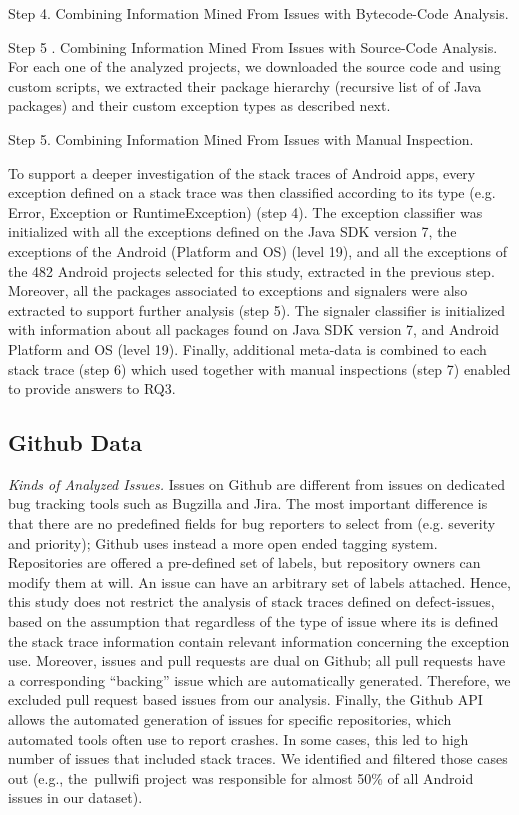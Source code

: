 \documentclass[conference]{IEEEtran}
\begin{document}
Step 4. Combining Information Mined From Issues with Bytecode-Code Analysis. 


Step 5
. Combining Information Mined From Issues with Source-Code Analysis.
For each one of the analyzed projects, we
downloaded the source code and using custom scripts, we extracted their package
hierarchy (recursive list of of Java packages) and their custom exception types
as described next.




Step 5. Combining Information Mined From Issues with Manual Inspection.

To support a deeper investigation of the stack traces of Android apps, every
exception defined on a stack trace was then classified according to its type
(e.g. Error, Exception or RuntimeException) (step 4). The exception classifier
was initialized with all the exceptions defined on the Java SDK version 7, the
exceptions of the Android (Platform and OS) (level 19), and all the exceptions
of the 482 Android projects selected for this study, extracted in the previous
step. Moreover, all the packages associated to exceptions and signalers were
also extracted to support further analysis (step 5). The signaler classifier is
initialized with information about all packages found on Java SDK version 7, and
Android Platform and OS (level 19). Finally, additional meta-data is combined to
each stack trace (step 6) which used together with manual inspections (step 7)
enabled to provide answers to RQ3.

\subsection{Github Data}
\label{sec:git}

\noindent\emph{Kinds of Analyzed Issues.} Issues on Github are different from
issues on dedicated bug tracking tools such as Bugzilla and Jira. The most
important difference is that there are no predefined fields for bug reporters to
select from (e.g. severity and priority); Github uses instead a more open ended
tagging system. Repositories are offered a pre-defined set of labels, but
repository owners can modify them at will. An issue can have an arbitrary set of
labels attached. Hence, this study does not restrict the analysis of stack
traces defined on defect-issues, based on the assumption that regardless of the
type of issue where its is defined the stack trace information contain relevant
information concerning the exception use. Moreover, issues and pull requests are
dual on Github; all pull requests have a corresponding ``backing'' issue which
are automatically generated. Therefore, we excluded pull request based
issues from our analysis. Finally, the Github API allows the automated
generation of issues for specific repositories, which automated tools often use
to report crashes. In some cases, this led to high number of issues that
included stack traces. We identified and filtered those cases out (e.g.,
the~\textsf{pullwifi} project was responsible for almost 50\% of all Android issues in our dataset).
\end{document}
